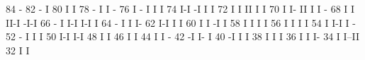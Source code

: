 \begin{Listing}
       84                                                                               -
       82                                                                             - I
       80                                                                             I I
       78                                                                       -     I I  -
       76                                                                       I -   I I  I
       74                                                                       I-I  -I I  I
       72                                                                       I I  II I  I
       70                                                                       I I- II I  I -
       68                                                                       I  I II-I -I-I
       66                                                                    -  I  I-I  I-I  I
       64                                                                  - I  I            I-
       62                                                                  I-I  I             I
       60                                                                  I I -I             I
       58                                                                  I I I              I
       56                                                                  I I I              I
       54                                                                  I I-I              I -
       52                                                                - I                  I I
       50                                                                I-I                  I-I
       48                                                                I                      I
       46                                                                I                      I
       44                                                                I                      I   -
       42                                                               -I                      I-  I
       40                                                              -I                        I  I
       38                                                              I                         I  I
       36                                                              I                         I  I-
       34                                                              I                         I--II
       32                                                              I                             I

\end{Listing}
